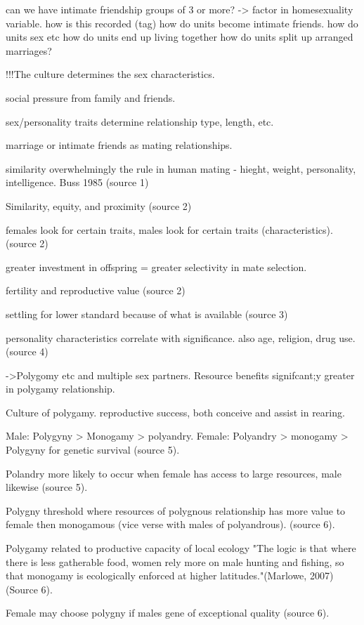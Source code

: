 can we have intimate friendship groups of 3 or more? -> factor in homesexuality variable.
how is this recorded (tag)
how do units become intimate friends.
how do units sex etc
how do units end up living together
how do units split up
arranged marriages?


!!!The culture determines the sex characteristics.

social pressure from family and friends.

sex/personality traits determine relationship type, length, etc.

marriage or intimate friends as mating relationships.

similarity overwhelmingly the rule in human mating - hieght, weight, personality, intelligence. Buss 1985 (source 1)

Similarity, equity, and proximity (source 2)

females look for certain traits, males look for certain traits (characteristics).(source 2)

greater investment in offspring = greater selectivity in mate selection.

fertility and reproductive value (source 2)

settling for lower standard because of what is available (source 3)

personality characteristics correlate with significance. also age, religion, drug use. (source 4) 


->Polygomy etc and multiple sex partners.
Resource benefits signifcant;y greater in polygamy relationship.

Culture of polygamy.
reproductive success, both conceive and assist in rearing.

Male: Polygyny > Monogamy > polyandry. Female: Polyandry > monogamy > Polygyny for genetic survival (source 5).

Polandry more likely to occur when female has access to large resources, male likewise (source 5).

Polygny threshold where resources of polygnous relationship has more value to female then monogamous (vice verse with males of polyandrous). (source 6).

Polygamy related to productive capacity of local ecology "The logic is that where there is less gatherable food, women rely more on male hunting and fishing, so that monogamy is ecologically enforced at higher latitudes."(Marlowe, 2007)(Source 6).

Female may choose polygny if males gene of exceptional quality (source 6).

